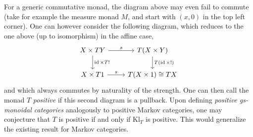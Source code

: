 \documentclass[a4paper,UKenglish,numberwithinsect,cleveref, autoref, thm-restate]{lipics-v2021}
\theoremstyle{plain} %
\theoremstyle{definition} %
\begin{document}
For a generic commutative monad, the diagram above may even fail to commute (take for example the measure monad $M$, and start with $(x,0)$ in the top left corner). One can however consider the following diagram, which reduces to the one above (up to isomorphism) in the affine case,
\[
 \begin{tikzcd}
   X \times TY \ar{d}{\id\times T!} \ar{r}{s} & T(X\times Y) \ar{d}{T(\id\times!)} \\
   X \times T1 \ar{r}{s} & T(X\times 1) \cong TX
  \end{tikzcd}
\]
and which always commutes by naturality of the strength.
One can then call the monad $T$ \emph{positive} if this second diagram is a pullback. Upon defining \emph{positive gs-monoidal categories} analogously to positive Markov categories, one may conjecture that $T$ is positive if and only if $\mathrm{Kl}_T$ is positive.
This would generalize the existing result for Markov categories.




\end{document}
